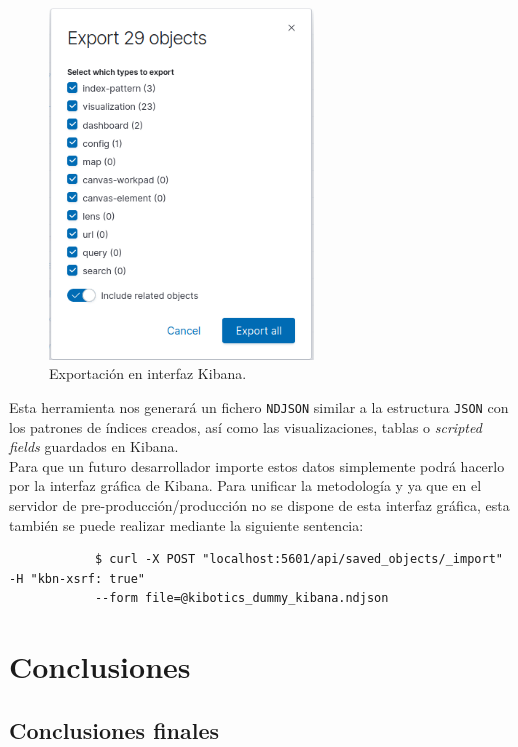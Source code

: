 \documentclass[a4paper, 12pt]{book}
\begin{document}
		\begin{figure}[H]
			\centering
			\includegraphics[width=7cm, keepaspectratio]{img/export_kibana.png}
			\caption{Exportación en interfaz Kibana.}
			\label{fig:export_kibana}
		\end{figure}
		
		Esta herramienta nos generará un fichero \texttt{NDJSON} similar a la estructura \texttt{JSON} con los patrones de índices creados, así como las visualizaciones, tablas o \textit{scripted fields} guardados en Kibana.\\
		
		Para que un futuro desarrollador importe estos datos simplemente podrá hacerlo por la interfaz gráfica de Kibana. Para unificar la metodología y ya que en el servidor de pre-producción/producción no se dispone de esta interfaz gráfica, esta también se puede realizar mediante la siguiente sentencia:\\
		
		
		{\footnotesize
		\begin{verbatim}
			$ curl -X POST "localhost:5601/api/saved_objects/_import" -H "kbn-xsrf: true" 
			--form file=@kibotics_dummy_kibana.ndjson
		\end{verbatim}
		}


	\cleardoublepage 
	\chapter{Conclusiones} 
	\label{chap:conclusiones} 
	
	
	\section{Conclusiones finales} 
	\label{sec:conclusiones_finales} 
\end{document}
